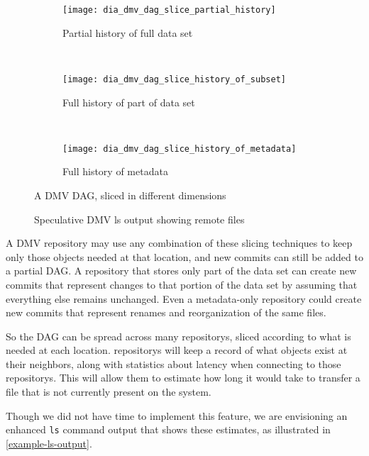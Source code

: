 \begin{figure}[p]

    \centering

    \begin{subfigure}[]{\slicediagramwidth}
        \texttt{[image: dia\_dmv\_dag\_slice\_partial\_history]}
        \caption{Partial history of full data set}
        \label{dia_dmv_dag_slice_partial_history}
    \end{subfigure}
    ~
    \begin{subfigure}[]{\slicediagramwidth}
        \texttt{[image: dia\_dmv\_dag\_slice\_history\_of\_subset]}
        \caption{Full history of part of data set}
        \label{dia_dmv_dag_slice_history_of_subset}
    \end{subfigure}
    ~
    \begin{subfigure}[]{\slicediagramwidth}
        \texttt{[image: dia\_dmv\_dag\_slice\_history\_of\_metadata]}
        \caption{Full history of metadata}
        \label{dia_dmv_dag_slice_history_of_metadata}
    \end{subfigure}

    \caption{A DMV DAG, sliced in different dimensions}
\end{figure}

\begin{figure}[p]
    \caption{Speculative DMV ls output showing remote files}
    \label{example-ls-output}
\end{figure}

A \gls{DMV} \gls{repository} may use any combination of these slicing techniques
to keep only those objects needed at that location, and new \glspl{commit} can
still be added to a partial \gls{DAG}. A \gls{repository} that stores only part
of the data set can create new \glspl{commit} that represent changes to that
portion of the data set by assuming that everything else remains unchanged. Even
a metadata-only \gls{repository} could create new \glspl{commit} that represent
renames and reorganization of the same files.

So the \gls{DAG} can be spread across many \glspl{repository}, sliced according
to what is needed at each location. \Glspl{repository} will keep a record of
what objects exist at their neighbors, along with statistics about latency when
connecting to those \glspl{repository}. This will allow them to estimate how
long it would take to transfer a file that is not currently present on the
system.

Though we did not have time to implement this feature, we are envisioning an
enhanced \lstinline{ls} command output that shows these estimates, as
illustrated in \autoref{example-ls-output}.

%
